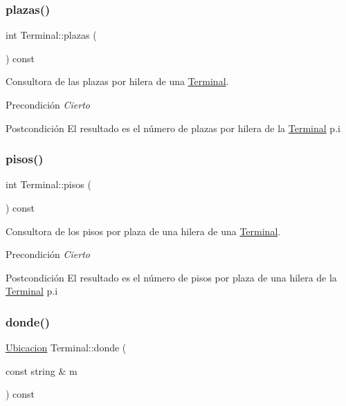 \subsubsection{\texorpdfstring{plazas()}{plazas()}}
{\footnotesize\ttfamily int Terminal\+::plazas (\begin{DoxyParamCaption}{ }\end{DoxyParamCaption}) const}



Consultora de las plazas por hilera de una \hyperlink{class_terminal}{Terminal}. 

\begin{DoxyPrecond}{Precondición}
{\itshape Cierto} 
\end{DoxyPrecond}
\begin{DoxyPostcond}{Postcondición}
El resultado es el número de plazas por hilera de la \hyperlink{class_terminal}{Terminal} p.\+i 
\end{DoxyPostcond}
\mbox{\label{class_terminal_ae6e79d13bb240d038142256552ae0ec9}} 
\subsubsection{\texorpdfstring{pisos()}{pisos()}}
{\footnotesize\ttfamily int Terminal\+::pisos (\begin{DoxyParamCaption}{ }\end{DoxyParamCaption}) const}



Consultora de los pisos por plaza de una hilera de una \hyperlink{class_terminal}{Terminal}. 

\begin{DoxyPrecond}{Precondición}
{\itshape Cierto} 
\end{DoxyPrecond}
\begin{DoxyPostcond}{Postcondición}
El resultado es el número de pisos por plaza de una hilera de la \hyperlink{class_terminal}{Terminal} p.\+i 
\end{DoxyPostcond}
\mbox{\label{class_terminal_a2847cb58fe61bb488f089bc67a1973fe}} 
\subsubsection{\texorpdfstring{donde()}{donde()}}
{\footnotesize\ttfamily \hyperlink{class_ubicacion}{Ubicacion} Terminal\+::donde (\begin{DoxyParamCaption}\item[{const string \&}]{m }\end{DoxyParamCaption}) const}



